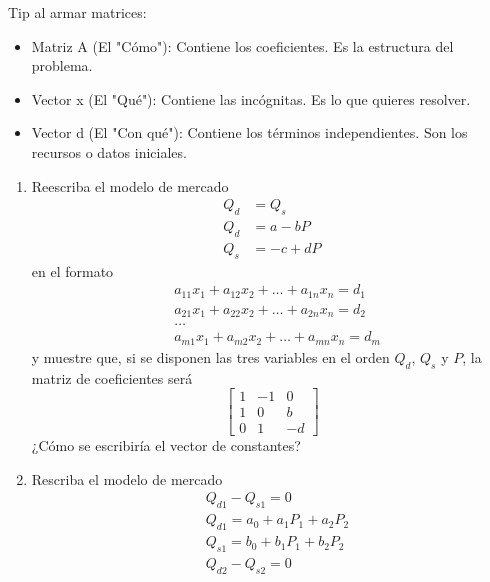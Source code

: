 \begin{nota}
Tip al armar matrices:
\begin{itemize}
    \item Matriz A (El "Cómo"): Contiene los coeficientes. Es la estructura del problema.
    \item Vector x (El "Qué"): Contiene las incógnitas. Es lo que quieres resolver.
    \item Vector d (El "Con qué"): Contiene los términos independientes. Son los recursos o datos iniciales.
\end{itemize}
\end{nota}

\begin{ejercicio}
    \begin{enumerate}
        \item Reescriba el modelo de mercado 
        $$
        \begin{aligned}
            Q_d &=Q_s \\
            Q_d &= a - bP \\
            Q_s &= -c + dP
        \end{aligned}
        $$
        en el formato 
        $$
        \begin{aligned}
        & a_{11}x_1+a_{12}x_2+\dots+a_{1n}x_n = d_1\\ 
        & a_{21}x_1+a_{22}x_2+\dots+a_{2n}x_n = d_2 \\
        & \dots \\
        & a_{m1}x_1+a_{m2}x_2+\dots+a_{mn}x_n = d_m
        \end{aligned}
        $$
        y muestre que, si se disponen las tres variables en el orden \(Q_d\), \(Q_s\) y \(P\), la matriz de coeficientes será
        $$
        \begin{bmatrix}
            1 & -1 & 0 \\
            1 & 0 & b \\
            0 & 1 & -d
        \end{bmatrix}
        $$
        ¿Cómo se escribiría el vector de constantes?
        \item Rescriba el modelo de mercado 
        $$
        \begin{aligned}
        & Q_{d1}-Q_{s1}=0 \\
        & Q_{d1}=a_0+a_1P_1+a_2P_2 \\ 
        & Q_{s1}=b_0+b_1P_1+b_2P_2 \\
        & Q_{d2}-Q_{s2}=0 \\

\end{aligned}$$
\end{enumerate}
\end{ejercicio}
